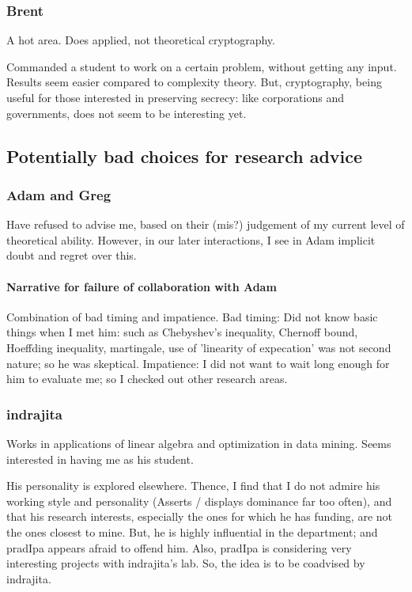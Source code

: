 \documentclass[oneside, article]{memoir}
\begin{document}
\subsubsection{Brent}
A hot area. Does applied, not theoretical cryptography.

Commanded a student to work on a certain problem, without getting any input. Results seem easier compared to complexity theory. But, cryptography, being useful for those interested in preserving secrecy: like corporations and governments, does not seem to be interesting yet.

\subsection{Potentially bad choices for research advice}
\subsubsection{Adam and Greg}
Have refused to advise me, based on their (mis?) judgement of my current level of theoretical ability. However, in our later interactions, I see in Adam implicit doubt and regret over this.

\paragraph*{Narrative for failure of collaboration with Adam} Combination of bad timing and impatience. Bad timing: Did not know basic things when I met him: such as Chebyshev's inequality, Chernoff bound, Hoeffding inequality, martingale, use of 'linearity of expecation' was not second nature; so he was skeptical. Impatience: I did not want to wait long enough for him to evaluate me; so I checked out other research areas.

\subsubsection{indrajita}
Works in applications of linear algebra and optimization in data mining. Seems interested in having me as his student.

His personality is explored elsewhere. Thence, I find that I do not admire his working style and personality (Asserts / displays dominance far too often), and that his research interests, especially the ones for which he has funding, are not the ones closest to mine. But, he is highly influential in the department; and pradIpa appears afraid to offend him. Also, pradIpa is considering very interesting projects with indrajita's lab. So, the idea is to be coadvised by indrajita.
\end{document}
